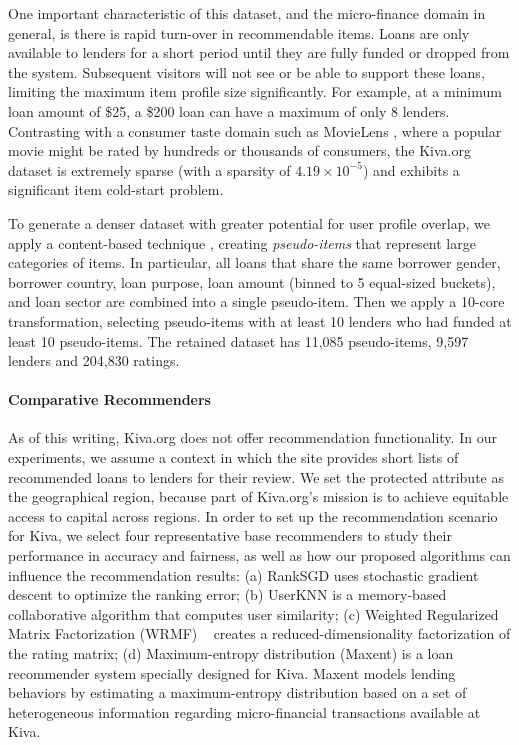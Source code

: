 One important characteristic of this dataset, and the micro-finance domain in general, is there is rapid turn-over in recommendable items. Loans are only available to lenders for a short period until they are fully funded or dropped from the system. Subsequent visitors will not see or be able to support these loans, limiting the maximum item profile size significantly. For example, at a minimum loan amount of \$25, a \$200 loan can have a maximum of only 8 lenders. Contrasting with a consumer taste domain such as MovieLens \cite{movielens}, where a popular movie might be rated by hundreds or thousands of consumers, the Kiva.org dataset is extremely sparse (with a sparsity of $4.19\times 10^{-5}$) and exhibits a significant item cold-start problem.

To generate a denser dataset with greater potential for user profile overlap, we apply a content-based technique \cite{resnick1997recommender}, creating \textit{pseudo-items} that represent large categories of items. In particular, all loans that share the same borrower gender, borrower country, loan purpose, loan amount (binned to 5 equal-sized buckets), and loan sector are combined into a single pseudo-item. Then we apply a 10-core transformation, selecting pseudo-items with at least 10 lenders who had funded at least 10 pseudo-items. The retained dataset has 11,085 pseudo-items, 9,597 lenders and 204,830 ratings.

\paragraph{\textbf{Comparative Recommenders}}
As of this writing, Kiva.org does not offer recommendation functionality. In our experiments, we assume a context in which the site provides short lists of recommended loans to lenders for their review. We set the protected attribute as the geographical region, because part of Kiva.org's mission is to achieve equitable access to capital across regions. In order to set up the recommendation scenario for Kiva, we select four representative base recommenders to study their performance in accuracy and fairness, as well as how our proposed algorithms can influence the recommendation results: (a) RankSGD \cite{pmlr-v18-jahrer12b} uses stochastic gradient descent to optimize the ranking error; (b) UserKNN \cite{resnick1997recommender}  is a memory-based collaborative algorithm that computes user similarity; (c) Weighted Regularized Matrix Factorization (WRMF) ~\cite{hu2008collaborative} creates a reduced-dimensionality factorization of the rating matrix; (d) Maximum-entropy distribution (Maxent) \cite{choo2014gather} is a loan recommender system specially designed for Kiva. Maxent models lending behaviors by estimating a maximum-entropy distribution based on a set of heterogeneous information regarding micro-financial transactions available at Kiva.


